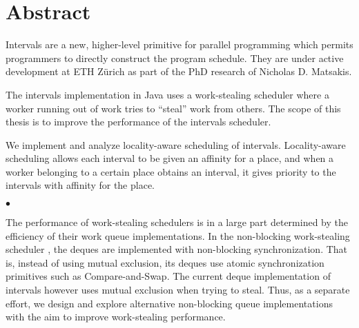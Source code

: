 
\chapter*{Abstract}
\label{chap:abstract}

Intervals are a new, higher-level primitive for parallel programming
which permits programmers to directly construct the program
schedule. They are under active development at ETH Zürich as part of
the PhD research of Nicholas D. Matsakis.

The intervals implementation in Java uses a work-stealing scheduler
where a worker running out of work tries to ``steal'' work from
others. The scope of this thesis is to improve the performance of the
intervals scheduler.

We implement and analyze locality-aware scheduling of
intervals. Locality-aware scheduling allows each interval to be given
an affinity for a place, and when a worker belonging to a certain
place obtains an interval, it gives priority to the intervals with
affinity for the place.

\begin{center}
  $\bullet$
\end{center}

The performance of work-stealing schedulers is in a large part
determined by the efficiency of their work queue implementations. In
the non-blocking work-stealing scheduler \cite{Arora2001}, the deques
are implemented with non-blocking synchronization. That is, instead of
using mutual exclusion, its deques use atomic synchronization
primitives such as Compare-and-Swap. The current deque implementation
of intervals however uses mutual exclusion when trying to steal. Thus,
as a separate effort, we design and explore alternative non-blocking
queue implementations with the aim to improve work-stealing
performance.



